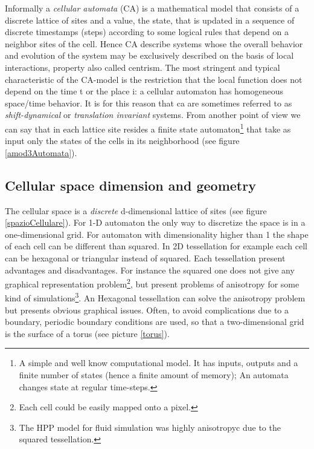 Informally a \emph{cellular automata} (CA) is a mathematical model that
consists of a discrete lattice of sites  and a value, the state, that is
updated in a sequence of discrete timestamps (steps) according to some logical rules that
depend on a neighbor  sites of the cell. Hence CA describe systems whose the
overall behavior and evolution of the system may be exclusively described on the basis of local
interactions\cite{wolfram1984}, property also called centrism.
The most stringent and typical characteristic of the CA-model is the restriction
that the local function does not depend on the time t or the place i: a cellular automaton has homogeneous
space/time behavior. It is for this reason that ca are sometimes referred to as
\textit{shift-dynamical} or \textit{translation invariant} systems. From another
point of view we can say that in each lattice site resides a finite state
automaton\footnote{A simple and well know computational model. It has inputs,
outputs and a finite number of states (hence a finite amount of memory);
An automata changes state at regular time-steps.}  that take as
input only the states of the cells in its neighborhood (see figure \ref{amod3Automata}).

\subsection{Cellular space dimension and geometry}
The cellular space is a \emph{discrete} d-dimensional lattice of sites (see
figure \ref{spazioCellulare}).
For 1-D automaton the only way to discretize the space is in a one-dimensional
grid. For automaton with dimensionality higher than 1 the shape of each cell can
be different than squared. In 2D tessellation for example each cell can be
hexagonal or triangular instead of squared. Each tessellation present advantages
and disadvantages. For instance the squared one does not give any graphical
representation problem\footnote{Each cell could be easily mapped onto a
pixel.}, but present problems of anisotropy for some kind of
simulations\footnote{The HPP model for fluid simulation was highly anisotropyc due to the squared tessellation.}\cite{Frisch1986}.
An Hexagonal tessellation can solve the anisotropy problem\cite{wolfram1986} but
presents obvious graphical issues. Often, to avoid complications
due to a boundary, periodic boundary conditions are used, so that a two-dimensional grid
is the surface of a torus (see picture \ref{torus}).



